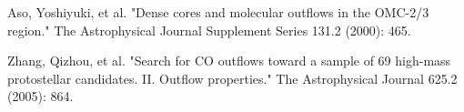 \documentclass[twoside,11pt]{gshs_thesis}
\begin{document}
\begin{thebibliography}{99}
\begin{onehalfspace}
Aso, Yoshiyuki, et al. "Dense cores and molecular outflows in the OMC-2/3 region." The Astrophysical Journal Supplement Series 131.2 (2000): 465.



Zhang, Qizhou, et al. "Search for CO outflows toward a sample of 69 high-mass protostellar candidates. II. Outflow properties." The Astrophysical Journal 625.2 (2005): 864.

\end{onehalfspace}\end{thebibliography}




\end{document}
